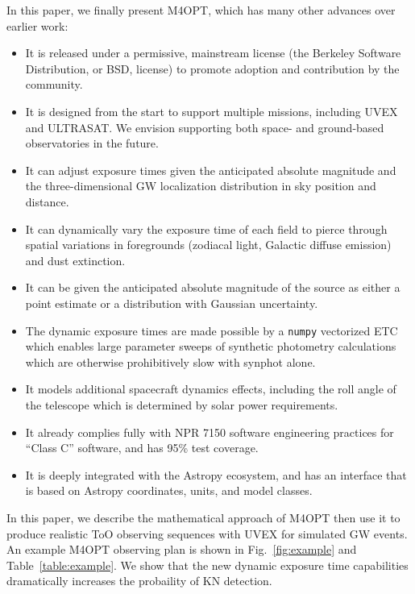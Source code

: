 \documentclass[twocolumn,times]{aastex631}
\begin{document}
In this paper, we finally present \ac{M4OPT}, which has many other advances over earlier work:
%
\begin{itemize}
    \item It is released under a permissive, mainstream license (the Berkeley Software Distribution, or BSD, license) to promote adoption and contribution by the community.
    \item It is designed from the start to support multiple missions, including \ac{UVEX} and ULTRASAT. We envision supporting both space- and ground-based observatories in the future.
    \item It can adjust exposure times given the anticipated absolute magnitude and the three-dimensional \ac{GW} localization distribution in sky position and distance.
    \item It can dynamically vary the exposure time of each field to pierce through spatial variations in foregrounds (zodiacal light, Galactic diffuse emission) and dust extinction.
    \item It can be given the anticipated absolute magnitude of the source as either a point estimate or a distribution with Gaussian uncertainty.
    \item The dynamic exposure times are made possible by a \texttt{numpy} \citep{harris2020array} vectorized \ac{ETC} which enables large parameter sweeps of synthetic photometry calculations which are otherwise prohibitively slow with synphot \citep{2018ascl.soft11001S} alone.
    \item It models additional spacecraft dynamics effects, including the roll angle of the telescope which is determined by solar power requirements.
    \item It already complies fully with \ac{NPR} 7150 \citep{NPR7150} software engineering practices for ``Class C'' software, and has 95\% test coverage.
    \item It is deeply integrated with the Astropy \citep{2013A&A...558A..33A,2018AJ....156..123A} ecosystem, and has an interface that is based on Astropy coordinates, units, and model classes.
\end{itemize}

In this paper, we describe the mathematical approach of \ac{M4OPT} then use it to produce realistic \ac{ToO} observing sequences with \ac{UVEX} for simulated \ac{GW} events. An example \ac{M4OPT} observing plan is shown in Fig.~\ref{fig:example} and Table~\ref{table:example}. We show that the new dynamic exposure time capabilities dramatically increases the probaility of \ac{KN} detection.
\end{document}
